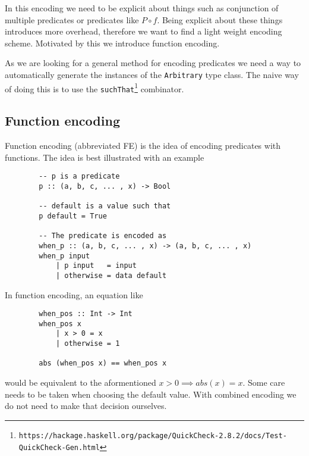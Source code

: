         In this encoding we need to be explicit about things such as conjunction
        of multiple predicates or predicates like $P\circ f$.
        Being explicit about these things introduces more overhead, therefore
        we want to find a light weight encoding scheme. Motivated by this
        we introduce function encoding.

        As we are looking for a general method for encoding predicates we need
        a way to automatically generate the instances of the \texttt{Arbitrary} type class.
        The naive way of doing this is to use the
        \texttt{suchThat}\footnote{\texttt{https://hackage.haskell.org/package/QuickCheck-2.8.2/docs/Test-QuickCheck-Gen.html}} 
        combinator. 

    \subsection{Function encoding}

        Function encoding (abbreviated FE) is the idea of encoding 
        predicates with functions. The idea is best
        illustrated with an example
        \begin{verbatim}
        -- p is a predicate
        p :: (a, b, c, ... , x) -> Bool

        -- default is a value such that
        p default = True

        -- The predicate is encoded as
        when_p :: (a, b, c, ... , x) -> (a, b, c, ... , x)
        when_p input
            | p input   = input
            | otherwise = data default
        \end{verbatim}
        In function encoding, an equation like
        \begin{verbatim}
        when_pos :: Int -> Int
        when_pos x
            | x > 0 = x
            | otherwise = 1

        abs (when_pos x) == when_pos x

        \end{verbatim}
        would be equivalent to the aformentioned $x > 0 \implies abs(x) = x$.
        Some care needs to be taken when choosing the default value.
        With combined encoding we do not need to make that decision ourselves.


